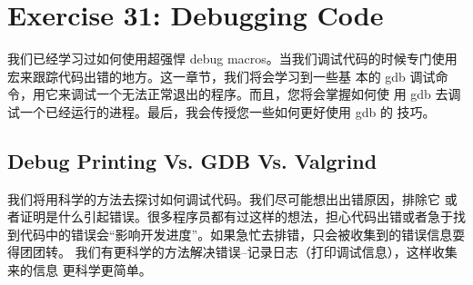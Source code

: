 \chapter{Exercise 31: Debugging Code}

我们已经学习过如何使用超强悍 debug macros。当我们调试代码的时候专门使用
宏来跟踪代码出错的地方。这一章节，我们将会学习到一些基
本的 gdb 调试命令，用它来调试一个无法正常退出的程序。而且，您将会掌握如何使
用 gdb 去调试一个已经运行的进程。最后，我会传授您一些如何更好使用 gdb 的
技巧。

\section{Debug Printing Vs. GDB Vs. Valgrind}

我们将用科学的方法去探讨如何调试代码。我们尽可能想出出错原因，排除它
或者证明是什么引起错误。很多程序员都有过这样的想法，担心代码出错或者急于找
到代码中的错误会“影响开发进度”。如果急忙去排错，只会被收集到的错误信息耍得团团转。
我们有更科学的方法解决错误--记录日志（打印调试信息），这样收集来的信息
更科学更简单。


